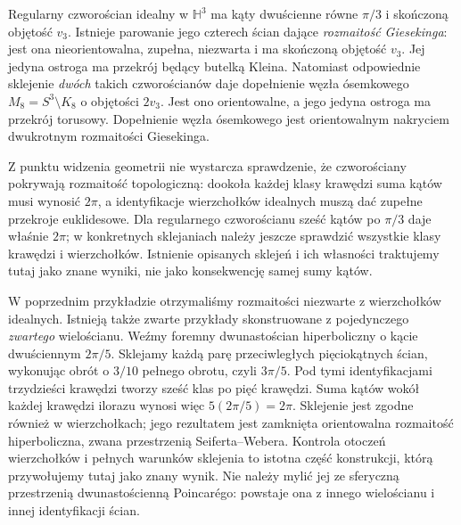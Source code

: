 \begin{przyklad}
\label{prz:thur-dop-gieseking-osemka}
Regularny czworościan idealny w $\mathbb H^3$ ma kąty
dwuścienne równe $\pi/3$ i skończoną objętość $v_3$.
Istnieje parowanie jego czterech ścian dające
\emph{rozmaitość Giesekinga}: jest ona nieorientowalna,
zupełna, niezwarta i ma skończoną objętość $v_3$.
Jej jedyna ostroga ma przekrój będący butelką Kleina.
Natomiast odpowiednie sklejenie \emph{dwóch} takich
czworościanów daje dopełnienie węzła ósemkowego
$M_8=S^3\setminus K_8$ o objętości $2v_3$.
Jest ono orientowalne, a jego jedyna ostroga ma przekrój torusowy.
Dopełnienie węzła ósemkowego jest orientowalnym
nakryciem dwukrotnym rozmaitości Giesekinga.

Z punktu widzenia geometrii nie wystarcza sprawdzenie,
że czworościany pokrywają rozmaitość topologiczną:
dookoła każdej klasy krawędzi suma kątów musi wynosić
$2\pi$, a identyfikacje wierzchołków idealnych
muszą dać zupełne przekroje euklidesowe.
Dla regularnego czworościanu sześć kątów po $\pi/3$
daje właśnie $2\pi$; w konkretnych sklejaniach należy
jeszcze sprawdzić wszystkie klasy krawędzi i wierzchołków.
Istnienie opisanych sklejeń i ich własności traktujemy
tutaj jako znane wyniki, nie jako konsekwencję samej sumy kątów.
\end{przyklad}


\begin{przyklad}
\label{prz:thur-dop-seifert-weber}
W poprzednim przykładzie otrzymaliśmy rozmaitości niezwarte
z wierzchołków idealnych. Istnieją także zwarte przykłady
skonstruowane z pojedynczego \emph{zwartego} wielościanu.
Weźmy foremny dwunastościan hiperboliczny o kącie dwuściennym
$2\pi/5$. Sklejamy każdą parę przeciwległych pięciokątnych
ścian, wykonując obrót o $3/10$ pełnego obrotu, czyli $3\pi/5$.
Pod tymi identyfikacjami trzydzieści krawędzi tworzy
sześć klas po pięć krawędzi. Suma kątów wokół każdej
krawędzi ilorazu wynosi więc $5(2\pi/5)=2\pi$.
Sklejenie jest zgodne również w wierzchołkach; jego
rezultatem jest zamknięta orientowalna rozmaitość
hiperboliczna, zwana przestrzenią Seiferta--Webera.
Kontrola otoczeń wierzchołków i pełnych warunków
sklejenia to istotna część konstrukcji, którą
przywołujemy tutaj jako znany wynik.
Nie należy mylić jej ze sferyczną przestrzenią
dwunastościenną Poincarégo: powstaje ona z innego
wielościanu i innej identyfikacji ścian.
\end{przyklad}

